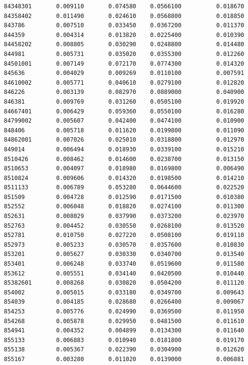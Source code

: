 \documentclass[
  letterpaper,
  DIV=11,
  numbers=noendperiod]{scrartcl}
\begin{document}
\begin{verbatim}
84348301       0.009110       0.074580    0.0566100          0.018670
84358402       0.011490       0.024610    0.0568800          0.018850
843786         0.007510       0.033450    0.0367200          0.011370
844359         0.004314       0.013820    0.0225400          0.010390
84458202       0.008805       0.030290    0.0248800          0.014480
844981         0.005731       0.035020    0.0355300          0.012260
84501001       0.007149       0.072170    0.0774300          0.014320
845636         0.004029       0.009269    0.0110100          0.007591
84610002       0.005771       0.040610    0.0279100          0.012820
846226         0.003139       0.082970    0.0889000          0.040900
846381         0.009769       0.031260    0.0505100          0.019920
84667401       0.006429       0.059360    0.0550100          0.016280
84799002       0.005607       0.042400    0.0474100          0.010900
848406         0.005718       0.011620    0.0199800          0.011090
84862001       0.007026       0.025010    0.0318800          0.012970
849014         0.006494       0.018930    0.0339100          0.015210
8510426        0.008462       0.014600    0.0238700          0.013150
8510653        0.004097       0.018980    0.0169800          0.006490
8510824        0.009606       0.014320    0.0198500          0.014210
8511133        0.006789       0.053280    0.0644600          0.022520
851509         0.004728       0.012590    0.0171500          0.010380
852552         0.006048       0.018820    0.0274100          0.011300
852631         0.008029       0.037990    0.0373200          0.023970
852763         0.004452       0.030550    0.0268100          0.013520
852781         0.010750       0.027220    0.0508100          0.019110
852973         0.005233       0.030570    0.0357600          0.010830
853201         0.005627       0.030330    0.0340700          0.013540
853401         0.006248       0.033740    0.0519600          0.011580
853612         0.005551       0.034140    0.0420500          0.010440
85382601       0.008268       0.030820    0.0504200          0.011120
854002         0.005015       0.033180    0.0349700          0.009643
854039         0.004185       0.028680    0.0266400          0.009067
854253         0.005776       0.024990    0.0369500          0.011950
854268         0.005878       0.029950    0.0481500          0.011610
854941         0.004352       0.004899    0.0134300          0.011640
855133         0.006883       0.010940    0.0181800          0.019170
855138         0.005367       0.022390    0.0304900          0.012620
855167         0.003280       0.011020    0.0139000          0.006881

\end{verbatim}
\end{document}
